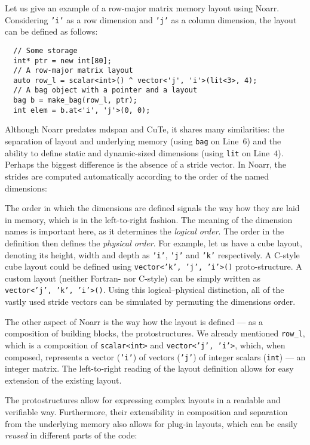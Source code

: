Let us give an example of a row-major matrix memory layout using Noarr. Considering \texttt{'i'} as a row dimension and \texttt{'j'} as a column dimension, the layout can be defined as follows:

\begin{verbatim}
  // Some storage
  int* ptr = new int[80];
  // A row-major matrix layout
  auto row_l = scalar<int>() ^ vector<'j', 'i'>(lit<3>, 4);
  // A bag object with a pointer and a layout
  bag b = make_bag(row_l, ptr);
  int elem = b.at<'i', 'j'>(0, 0);
\end{verbatim}

Although Noarr predates mdspan and CuTe, it shares many similarities: the separation of layout and underlying memory (using \texttt{bag} on Line~$6$) and the ability to define static and dynamic-sized dimensions (using \texttt{lit} on Line~$4$). Perhaps the biggest difference is the absence of a stride vector. In Noarr, the strides are computed automatically according to the order of the named dimensions:

The order in which the dimensions are defined signals the way how they are laid in memory, which is in the left-to-right fashion. The meaning of the dimension names is important here, as it determines the \emph{logical order}. The order in the definition then defines the \emph{physical order}. For example, let us have a cube layout, denoting its height, width and depth as \texttt{'i'}, \texttt{'j'} and \texttt{'k'} respectively. A C-style cube layout could be defined using \texttt{vector<'k', 'j', 'i'>()} proto-structure. A custom layout (neither Fortran- nor C-style) can be simply written as \texttt{vector<'j', 'k', 'i'>()}. Using this logical--physical distinction, all of the vastly used stride vectors can be simulated by permuting the dimensions order.

The other aspect of Noarr is the way how the layout is defined --- as a composition of building blocks, the protostructures. We already mentioned \texttt{row\_l}, which is a composition of \texttt{scalar<int>} and \texttt{vector<'j', 'i'>}, which, when composed, represents a vector (\texttt{'i'}) of vectors (\texttt{'j'}) of integer scalars (\texttt{int}) --- an integer matrix. The left-to-right reading of the layout definition allows for easy extension of the existing layout.

The protostructures allow for expressing complex layouts in a readable and verifiable way. Furthermore, their extensibility in composition and separation from the underlying memory also allows for plug-in layouts, which can be easily \emph{reused} in different parts of the code:

